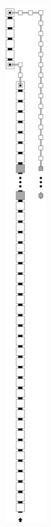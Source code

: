 \begin{figure}[H]
\begin{subfigure}[t]{0.2\textwidth}
            \includegraphics[width=0.2\textwidth]{digit_top_case2_digit2_msr}

\end{subfigure}
\end{figure}
